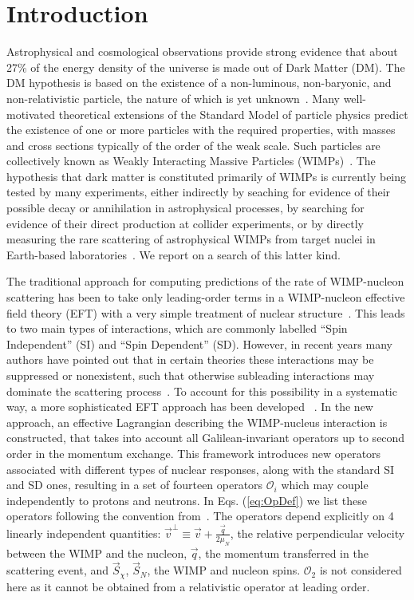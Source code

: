 \section{Introduction}

Astrophysical and cosmological observations provide strong evidence that about 27\% of the energy density of the universe is made out of Dark Matter (DM). The DM hypothesis is based on the existence of a non-luminous, non-baryonic, and non-relativistic particle, the nature of which is yet unknown~\cite{Harvey1462,WMAP:9years,PLANCK}. 
Many well-motivated theoretical extensions of the Standard Model of particle physics predict the existence of one or more particles with the required properties, with masses and cross sections typically of the order of the weak scale. Such particles are collectively known as Weakly Interacting Massive Particles (WIMPs)~\cite{Bertone:2010zza}. The hypothesis that dark matter is constituted primarily of WIMPs is currently being tested by many experiments, either indirectly by seaching for evidence of their possible decay or annihilation in astrophysical processes, by searching for evidence of their direct production at collider experiments, or by directly measuring the rare scattering of astrophysical WIMPs from target nuclei in Earth-based laboratories~\cite{xe100_run_combination,PANDAX,LUXnew,COGENT,CDMSlite,CREST,DAMA}. We report on a search of this latter kind.


The traditional approach for computing predictions of the rate of WIMP-nucleon scattering has been to take only leading-order terms in a WIMP-nucleon effective field theory (EFT) with a very simple treatment of nuclear structure~\cite{LEWIN}. This leads to two main types of interactions, which are commonly labelled ``Spin Independent'' (SI) and ``Spin Dependent'' (SD). However, in recent years many authors have pointed out that in certain theories these interactions may be suppressed or nonexistent, such that otherwise subleading interactions may dominate the scattering process~\cite{Chang:2009yt}. To account for this possibility in a systematic way, a more sophisticated EFT approach has been developed ~\cite{Fitzpatrick:2012ib,Anand:MathTools,Fitzpatrick:MathTools}. In the new approach, an effective Lagrangian describing the WIMP-nucleus interaction is constructed, that takes into account all Galilean-invariant operators up to second order in the momentum exchange. This framework introduces new operators associated with different types of nuclear responses, along with the standard SI and SD ones, resulting in a set of fourteen operators $\mathcal{O}_i$ which may couple independently to protons and neutrons. In Eqs. (\ref{eq:OpDef}) we list these operators following the convention from~\cite{Anand:MathTools}. The operators depend explicitly on 4 linearly independent quantities: $\vec{v}^{\perp} \equiv \vec{v} + \frac{\vec{q}}{2\mu_N} $, the relative perpendicular velocity between the WIMP and the nucleon, $\vec{q}$, the momentum transferred in the scattering event, and $\vec{S}_\chi$, $\vec{S}_N$, the WIMP and nucleon spins. $\mathcal{O}_2$ is not considered here as it cannot be obtained from a relativistic operator at leading order.
%

